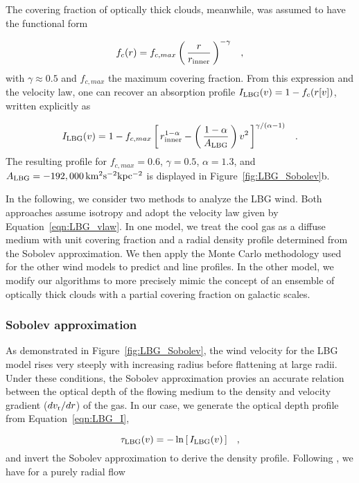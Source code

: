 \documentclass[12pt,preprint]{aastex}
\begin{document}
The covering fraction of optically thick clouds, meanwhile, was assumed to have
the functional form

\begin{equation}
f_c(r) = f_{c,max} \left ( \, \frac{r}{r_{\rm inner}} \, \right )^{-\gamma} \;\;\; ,
\label{eqn:covering}
\end{equation}
with $\gamma \approx 0.5$ and $f_{c,max}$ the maximum covering
fraction.  From this expression and the velocity law, one can recover
an absorption profile $I_{\rm LBG}(v) = 1 - f_c(r[v])$, written
explicitly as

\begin{equation}
I_{\rm LBG}(v) = 1 - f_{c,max} \left [ \, r_{\rm inner}^{1-\alpha} - \left ( \,
\frac{1-\alpha}{A_{\rm LBG}} \, \right ) v^2 \, \right ]^{\gamma/(\alpha-1)}
\;\;\; .
\label{eqn:LBG_I}
\end{equation}
The resulting profile for $f_{c,max} = 0.6$, $\gamma=0.5$,
$\alpha=1.3$, and $A_{\rm LBG} = -192,000 \, \rm km^2 s^{-2} kpc^{-2}$ 
is displayed in Figure~\ref{fig:LBG_Sobolev}b.  

In the following, we consider two methods to analyze the LBG wind.
Both approaches assume isotropy and adopt the velocity law given by
Equation~\ref{eqn:LBG_vlaw}.  In one model, we treat the cool gas as a
diffuse medium with unit covering fraction and a radial density
profile determined from the Sobolev approximation.  We then apply 
the Monte Carlo methodology used for the other wind models to predict
 and  line profiles.  In the other model,
we modify our algorithms to more precisely mimic the concept of an
ensemble of optically thick clouds with a partial covering fraction on
galactic scales.

\subsubsection{Sobolev approximation}
\label{sec:Sobolev}

As demonstrated in Figure~\ref{fig:LBG_Sobolev}, the wind velocity for
the LBG model rises very steeply with increasing radius before
flattening at large radii.  Under these conditions, the Sobolev
approximation provies an accurate relation between the optical depth
of the flowing medium to the
density and velocity gradient ($dv_{\rm r}/dr$) of the gas.  In our case, we 
generate the optical depth profile from Equation~\ref{eqn:LBG_I}, 

\begin{equation}
\tau_{\rm LBG}(v) = -\ln \left [ \, I_{\rm LBG}(v) \, \right ] \;\;\; ,
\label{eqn:tauLBG}
\end{equation}
and invert the Sobolev approximation to derive the density profile.
Following \cite{lc99}, we have for a purely radial flow
\end{document}
